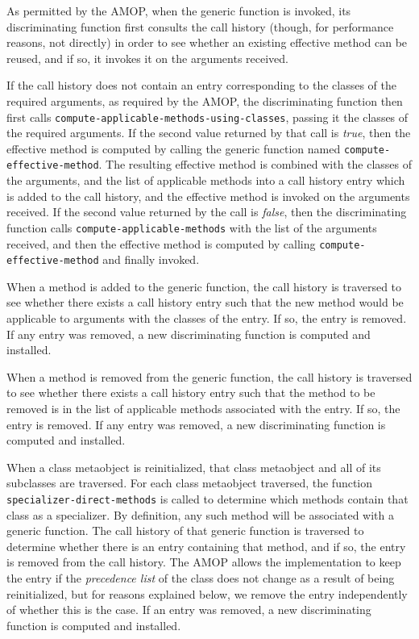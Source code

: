 As permitted by the AMOP, when the generic function is invoked, its
discriminating function first consults the call history (though, for
performance reasons, not directly) in order to see whether an existing
effective method can be reused, and if so, it invokes it on the
arguments received.

If the call history does not contain an entry corresponding to the
classes of the required arguments, as required by the AMOP, the
discriminating function then first calls
\texttt{compute-applicable-methods-using-classes}, passing it the
classes of the required arguments.  If the second value returned by
that call is \textit{true}, then the effective method is computed by
calling the generic function named \texttt{compute-effective-method}.
The resulting effective method is combined with the classes of the
arguments, and the list of applicable methods into a call history
entry which is added to the call history, and the effective method is
invoked on the arguments received.  If the second value returned by
the call is \textit{false}, then the discriminating function calls
\texttt{compute-applicable-methods} with the list of the arguments
received, and then the effective method is computed by calling
\texttt{compute-effective-method} and finally invoked.

When a method is added to the generic function, the call history is
traversed to see whether there exists a call history entry such that
the new method would be applicable to arguments with the classes of
the entry.  If so, the entry is removed.  If any entry was removed, a
new discriminating function is computed and installed. 

When a method is removed from the generic function, the call history
is traversed to see whether there exists a call history entry such
that the method to be removed is in the list of applicable methods
associated with the entry.  If so, the entry is removed. If any entry
was removed, a new discriminating function is computed and installed.


When a class metaobject is reinitialized, that class metaobject and
all of its subclasses are traversed.  For each class metaobject
traversed, the function \texttt{specializer-direct-methods} is called to determine
which methods contain that class as a specializer.  By definition, any
such method will be associated with a generic function.  The call
history of that generic function is traversed to determine whether
there is an entry containing that method, and if so, the entry is
removed from the call history.  The AMOP allows the implementation to
keep the entry if the \emph{precedence list} of the class does not
change as a result of being reinitialized, but for reasons explained
below, we remove the entry independently of whether this is the case.
If an entry was removed, a new discriminating function is computed and
installed.

